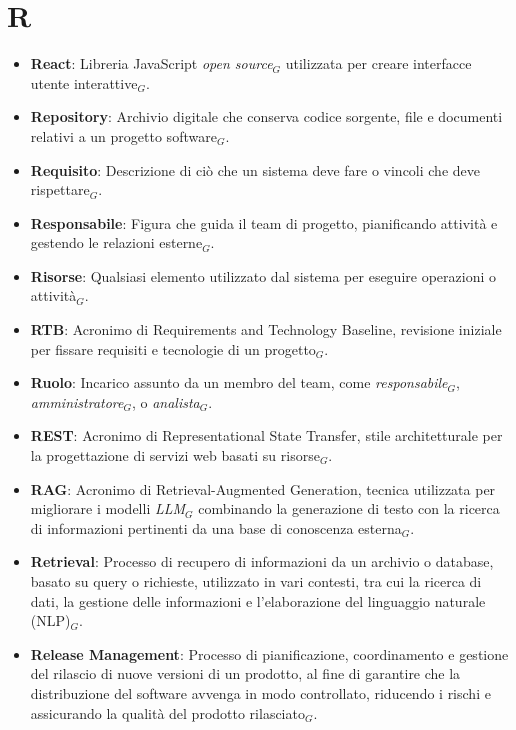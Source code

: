 \section{R}
\begin{itemize}
    \item \textbf{React}: Libreria JavaScript \textit{open source}$_G$ utilizzata per creare interfacce utente interattive$_G$.
    \item \textbf{Repository}: Archivio digitale che conserva codice sorgente, file e documenti relativi a un progetto software$_G$.
    \item \textbf{Requisito}: Descrizione di ciò che un sistema deve fare o vincoli che deve rispettare$_G$.
    \item \textbf{Responsabile}: Figura che guida il team di progetto, pianificando attività e gestendo le relazioni esterne$_G$.
    \item \textbf{Risorse}: Qualsiasi elemento utilizzato dal sistema per eseguire operazioni o attività$_G$.
    \item \textbf{RTB}: Acronimo di Requirements and Technology Baseline, revisione iniziale per fissare requisiti e tecnologie di un progetto$_G$.
    \item \textbf{Ruolo}: Incarico assunto da un membro del team, come \textit{responsabile}$_G$, \textit{amministratore}$_G$, o \textit{analista}$_G$.
    \item \textbf{REST}: Acronimo di Representational State Transfer, stile architetturale per la progettazione di servizi web basati su risorse$_G$.
    \item \textbf{RAG}: Acronimo di Retrieval-Augmented Generation, tecnica utilizzata per migliorare i modelli \textit{LLM}$_G$ combinando la generazione di testo con la ricerca di informazioni pertinenti da una base di conoscenza esterna$_G$.
    \item \textbf{Retrieval}: Processo di recupero di informazioni da un archivio o database, basato su query o richieste, utilizzato in vari contesti, tra cui la ricerca di dati, la gestione delle informazioni e l'elaborazione del linguaggio naturale (NLP)$_G$.
    \item \textbf{Release Management}: Processo di pianificazione, coordinamento e gestione del rilascio di nuove versioni di un prodotto, al fine di garantire che la distribuzione del software avvenga in modo controllato, riducendo i rischi e assicurando la qualità del prodotto rilasciato$_G$.
\end{itemize}
